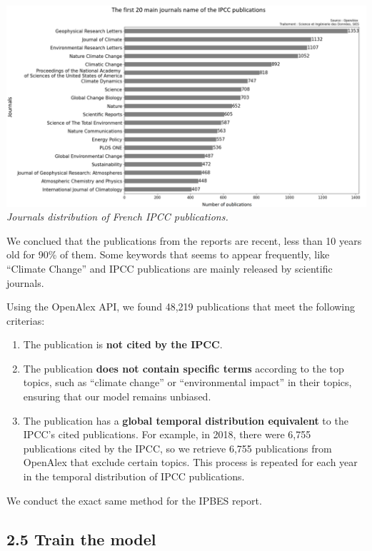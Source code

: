 \documentclass[
]{article}
\providecommand{\tightlist}{%
  \setlength{\itemsep}{0pt}\setlength{\parskip}{0pt}}
\begin{document}
\includegraphics{./images/locations_distribution_IPCC_model.png}
\emph{Journals distribution of French IPCC publications.}

We conclued that the publications from the reports are recent, less than
10 years old for 90\% of them. Some keywords that seems to appear
frequently, like ``Climate Change'' and IPCC publications are mainly
released by scientific journals.

Using the OpenAlex API, we found 48,219 publications that meet the
following criterias:

\begin{enumerate}
\def\labelenumi{\arabic{enumi}.}
\tightlist
\item
  The publication is \textbf{not cited by the IPCC}.
\item
  The publication \textbf{does not contain specific terms} according to
  the top topics, such as ``climate change'' or ``environmental impact''
  in their topics, ensuring that our model remains unbiased.
\item
  The publication has a \textbf{global temporal distribution equivalent}
  to the IPCC's cited publications. For example, in 2018, there were
  6,755 publications cited by the IPCC, so we retrieve 6,755
  publications from OpenAlex that exclude certain topics. This process
  is repeated for each year in the temporal distribution of IPCC
  publications.
\end{enumerate}

We conduct the exact same method for the IPBES report.

\hypertarget{train-the-model}{%
\subsection{2.5 Train the model}\label{train-the-model}}
\end{document}
